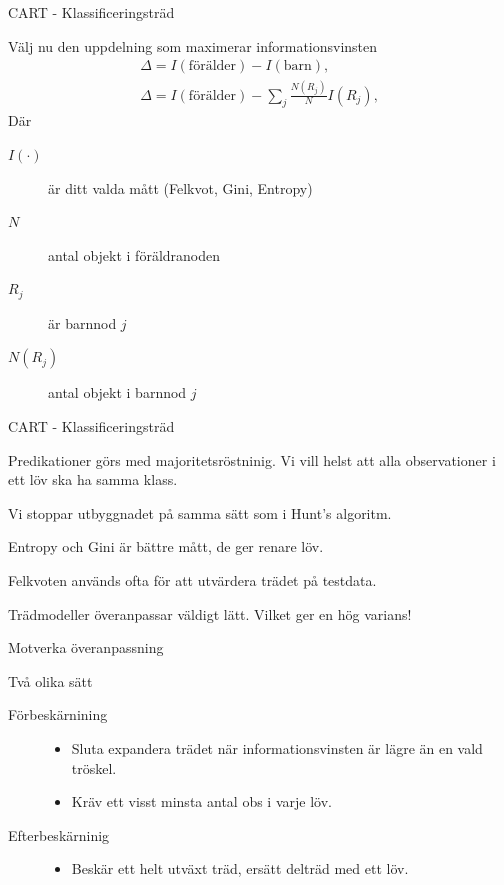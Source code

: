 \documentclass[10pt,english]{beamer}
\begin{document}
\begin{frame}{CART - Klassificeringsträd}

    Välj nu den uppdelning som maximerar informationsvinsten
    \begin{align*}
        \Delta = I(\text{förälder}) - I(\text{barn}), \\
        \Delta = I(\text{förälder}) - \sum_{j} \frac{N(R_j)}{N} I(R_j),
    \end{align*}
    Där
    \begin{description}
        \item[$I(\cdot)$] är ditt valda mått (Felkvot, Gini, Entropy)
        \item[$N$] antal objekt i föräldranoden
        \item[$R_j$] är barnnod $j$
        \item[$N(R_j)$] antal objekt i barnnod $j$    
    \end{description}
    
\end{frame}

\begin{frame}{CART - Klassificeringsträd}

    Predikationer görs med majoritetsröstninig. Vi vill helst att alla observationer i ett löv ska ha samma klass.

    Vi stoppar utbyggnadet på samma sätt som i Hunt's algoritm.

    Entropy och Gini är bättre mått, de ger renare löv.

    Felkvoten används ofta för att utvärdera trädet på testdata.

    Trädmodeller överanpassar väldigt lätt. Vilket ger en hög varians!
    
\end{frame}

\begin{frame}{Motverka överanpassning}

    Två olika sätt
    \begin{description}
        \item[Förbeskärnining]
        \begin{itemize}
            \item Sluta expandera trädet när informationsvinsten är lägre än en vald tröskel.
            \item Kräv ett visst minsta antal obs i varje löv.
        \end{itemize}
        \item[Efterbeskärninig]
        \begin{itemize}
            \item Beskär ett helt utväxt träd, ersätt delträd med ett löv.
        \end{itemize}
    \end{description}
    
\end{frame}
\end{document}
